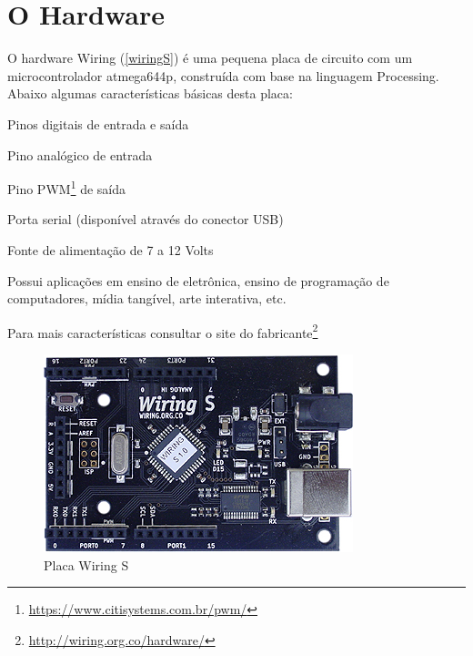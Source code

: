 \chapter[O Hardware]{O Hardware}

O hardware Wiring (\autoref{wiringS}) é uma pequena placa de circuito com um microcontrolador atmega644p, construída com base na linguagem Processing. Abaixo algumas características básicas desta placa: 

\begin{alineas}
    \item Pinos digitais de entrada e saída
    \item Pino analógico de entrada
    \item Pino PWM\footnote{\url{https://www.citisystems.com.br/pwm/}} de saída
    \item Porta serial (disponível através do conector USB)
    \item Fonte de alimentação de 7 a 12 Volts
\end{alineas}

Possui aplicações em ensino de eletrônica, ensino de programação de computadores, mídia tangível, arte interativa, etc.

Para mais características consultar o site do fabricante\footnote{\url{http://wiring.org.co/hardware/}}

\begin{figure}[htb]
	\caption{\label{wiringS}Placa Wiring S}
	\begin{center}
	    \includegraphics[scale=0.9]{artigo/refs/Rogue_BB_WRS}
	\end{center}
\end{figure}